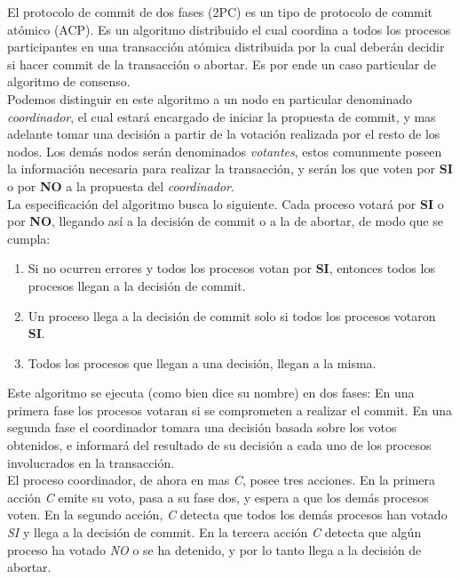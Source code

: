 \documentclass[titlepage, 12pt]{book}
\begin{document}
El protocolo de commit de dos fases (2PC) es un tipo de protocolo de commit atómico (ACP). Es un algoritmo distribuido el cual coordina a todos los procesos participantes en una transacción atómica distribuida por la cual deberán decidir si hacer commit de la transacción o abortar. Es por ende un caso particular de algoritmo de consenso.\\

Podemos distinguir en este algoritmo a un nodo en particular denominado \textit{coordinador}, el cual estará encargado de iniciar la propuesta de commit, y mas adelante tomar una decisión a partir de la votación realizada por el resto de los nodos. Los demás nodos serán denominados \textit{votantes}, estos comunmente poseen la información necesaria para realizar la transacción, y serán los que voten por \textbf{SI} o por \textbf{NO} a la propuesta del \textit{coordinador}.\\

La especificación del algoritmo busca lo siguiente. Cada proceso votará por \textbf{SI} o por \textbf{NO}, llegando así a la decisión de commit o a la de abortar, de modo que se cumpla:
\begin{enumerate}
\item Si no ocurren errores y todos los procesos votan por \textbf{SI}, entonces todos los procesos llegan a la decisión de commit.
\item Un proceso llega a la decisión de commit solo si todos los procesos votaron \textbf{SI}.
\item Todos los procesos que llegan a una decisión, llegan a la misma.
\end{enumerate}


Este algoritmo se ejecuta (como bien dice su nombre) en dos fases: En una primera fase los procesos votaran si se comprometen a realizar el commit. En una segunda fase el coordinador tomara una decisión basada sobre los votos obtenidos, e informará del resultado de su decisión a cada uno de los procesos involucrados en la transacción\cite{}.\\

El proceso coordinador, de ahora en mas \textit{C}, posee tres acciones. En la primera acción \textit{C} emite su voto, pasa a su fase dos, y espera a que los demás procesos voten. En la segundo acción, \textit{C} detecta que todos los demás procesos han votado \textit{SI} y llega a la decisión de commit. En la tercera acción \textit{C} detecta que algún proceso ha votado \textit{NO} o se ha detenido, y por lo tanto llega a la decisión de abortar.\\
\end{document}
